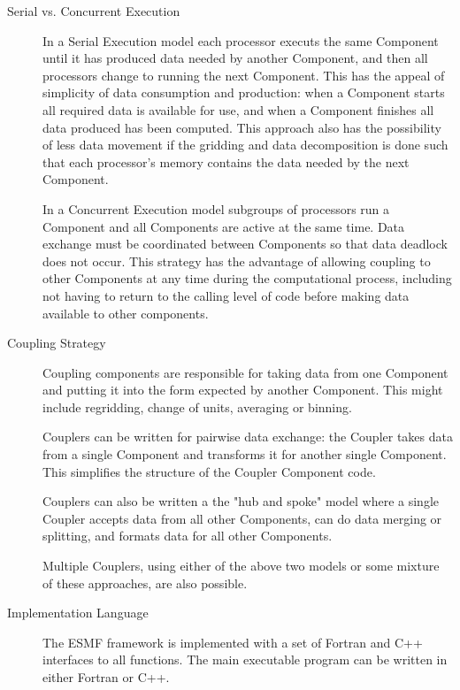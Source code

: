 \begin{description}

\item[Serial vs. Concurrent Execution]

In a Serial Execution model each processor 
executs the same Component until it has produced data needed
by another Component, and then all processors change to
running the next Component.  This has the appeal of simplicity
of data consumption and production: when a Component starts
all required data is available for use, and when a Component finishes
all data produced has been computed.  This approach also has
the possibility of less data movement if the gridding and
data decomposition is done such that each processor's memory contains
the data needed by the next Component.

In a Concurrent Execution model subgroups of processors run
a Component and all Components are active at the same time.  
Data exchange must be coordinated between Components so that
data deadlock does not occur.  This strategy has the advantage
of allowing coupling to other Components at any time during
the computational process, including not having to return to
the calling level of code before making data available to 
other components.

\item[Coupling Strategy]

Coupling components are responsible for taking data from one
Component and putting it into the form expected by another Component.
This might include regridding, change of units, averaging or binning.

Couplers can be written for pairwise data exchange: the Coupler takes
data from a single Component and transforms it for another single Component.
This simplifies the structure of the Coupler Component code.

Couplers can also be written a the "hub and spoke" model where a
single Coupler accepts data from all other Components, can do data
merging or splitting, and formats data for all other Components.

Multiple Couplers, using either of the above two models or some mixture of
these approaches, are also possible.

\item[Implementation Language]

The ESMF framework is implemented with a set of Fortran and C++ interfaces
to all functions.  The main executable program can be written in either
Fortran or C++.


\end{description}
